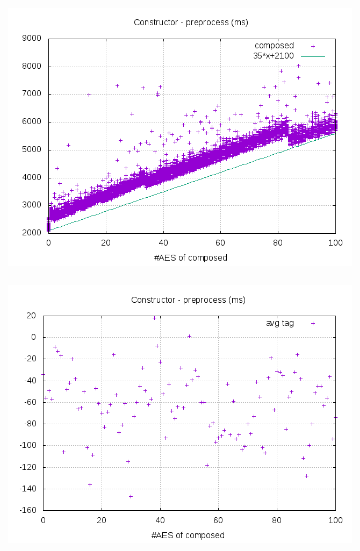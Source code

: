 \documentclass[10pt,a4paper]{article}
\begin{document}
\begin{figure}[h]
    \centering
    \begin{subfigure}[t]{0.3\textwidth}
        \includegraphics[width=\textwidth]{const_preprocess_plots}
        \caption{}
        \label{preprocess composed}
    \end{subfigure}
    \begin{subfigure}[t]{0.3\textwidth}
        \includegraphics[width=\textwidth]{const_preprocess_avg}
        \caption{}
        \label{preprocess tag}
    \end{subfigure}
    \begin{subfigure}[t]{0.3\textwidth}

\end{subfigure}
\end{figure}
\end{document}

